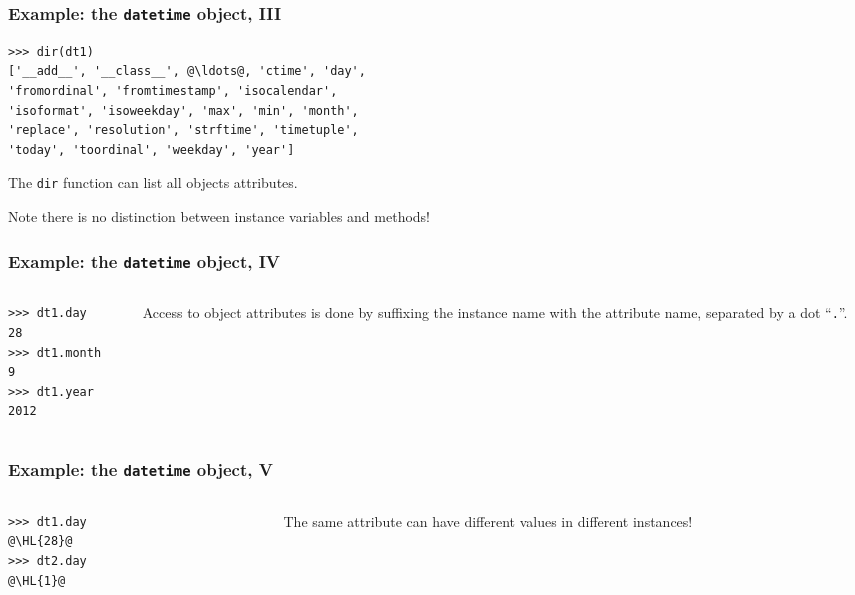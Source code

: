 \documentclass[english,serif,mathserif,xcolor=pdftex,dvipsnames,table]{beamer}
\begin{document}
\begin{frame}[fragile]
  \frametitle{Example: the \texttt{datetime} object, III}
\begin{lstlisting}
>>> dir(dt1)
['__add__', '__class__', @\ldots@, 'ctime', 'day', 
'fromordinal', 'fromtimestamp', 'isocalendar', 
'isoformat', 'isoweekday', 'max', 'min', 'month', 
'replace', 'resolution', 'strftime', 'timetuple', 
'today', 'toordinal', 'weekday', 'year']
\end{lstlisting}

  \+
  The \texttt{dir} function can list all objects attributes.

  \+ 
  Note there is no distinction between instance variables and
  methods!
\end{frame}


\begin{frame}[fragile]
  \frametitle{Example: the \texttt{datetime} object, IV}
  \begin{columns}[c]
    \begin{column}{0.5\textwidth}
\begin{lstlisting}
>>> dt1.day
28
>>> dt1.month
9
>>> dt1.year
2012
\end{lstlisting}
    \end{column}
    \begin{column}{0.5\textwidth}
      \raggedleft 
      Access to object attributes is done by suffixing the
      instance name with the attribute name, separated by a dot
      ``\texttt{.}''.
    \end{column}
  \end{columns}
\end{frame}


\begin{frame}[fragile]
  \frametitle{Example: the \texttt{datetime} object, V}
  \begin{columns}[c]
    \begin{column}{0.5\textwidth}
\begin{lstlisting}
>>> dt1.day
@\HL{28}@
>>> dt2.day
@\HL{1}@
\end{lstlisting}
    \end{column}
    \begin{column}{0.5\textwidth}
      \raggedleft 
      The same attribute can have different 
      values in different instances!
    \end{column}
  \end{columns}
\end{frame}
\end{document}
